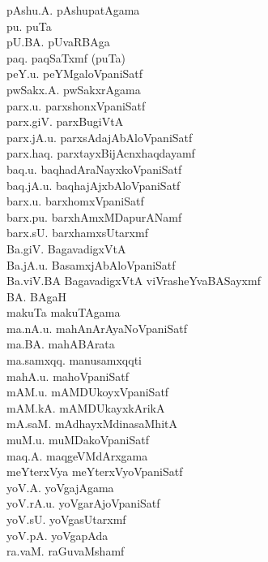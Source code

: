 {\begin{multicols}{2}
\begin{tabbing}
pAshu.A. \> pAshupatAgama\\[2pt]
pu. \> puTa\\[2pt]
pU.BA. \> pUvaRBAga\\[2pt]
paq. \> paqSaTxmf (puTa)\\[2pt]
peY.u. \> peYMgaloVpaniSatf\\[2pt]
pwSakx.A. \> pwSakxrAgama\\[2pt]
parx.u. \> parxshonxVpaniSatf\\[2pt]
parx.giV. \> parxBugiVtA\\[2pt]
parx.jA.u. \> parxsAdajAbAloVpaniSatf\\[2pt]
parx.haq. \> parxtayxBijAcnxhaqdayamf\\[2pt]
baq.u. \> baqhadAraNayxkoVpaniSatf\\[2pt]
baq.jA.u. \> baqhajAjxbAloVpaniSatf\\[2pt]
barx.u. \> barxhomxVpaniSatf\\[2pt]
barx.pu. \> barxhAmxMDapurANamf\\[2pt]
barx.sU. \> barxhamxsUtarxmf\\[2pt]
Ba.giV. \> BagavadigxVtA\\[2pt]
Ba.jA.u. \> BasamxjAbAloVpaniSatf\\[2pt]
Ba.viV.BA \> BagavadigxVtA viVrasheYvaBASayxmf\\[2pt]
BA. \> BAgaH\\[2pt]
makuTa \> makuTAgama\\[2pt]
ma.nA.u. \> mahAnArAyaNoVpaniSatf\\[2pt]
ma.BA. \> mahABArata\\[2pt]
ma.samxqq. \> manusamxqqti\\[2pt]
mahA.u. \> mahoVpaniSatf\\[2pt]
mAM.u. \> mAMDUkoyxVpaniSatf\\[2pt]
mAM.kA. \> mAMDUkayxkArikA\\[2pt]
mA.saM. \> mAdhayxMdinasaMhitA\\[2pt]
muM.u. \> muMDakoVpaniSatf\\[2pt]
maq.A. \> maqgeVMdArxgama\\[2pt]
meYterxVya \> meYterxVyoVpaniSatf\\[2pt]
yoV.A. \> yoVgajAgama\\[2pt]
yoV.rA.u. \> yoVgarAjoVpaniSatf\\[2pt]
yoV.sU. \> yoVgasUtarxmf\\[2pt]
yoV.pA. \> yoVgapAda\\[2pt]
ra.vaM. \> raGuvaMshamf\\[2pt]

\end{tabbing}
\end{multicols}}
